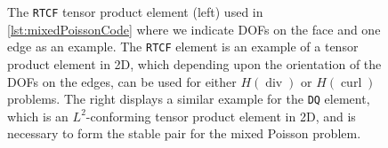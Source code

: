 \documentclass[format=acmsmall,screen,timestamp=false,a4paper]{acmart}
\DeclareMathOperator{\Div}{div}
\DeclareMathOperator{\curl}{curl}
\newcommand{\hcurl}{\ensuremath{{H}(\curl ) } }
\newcommand{\hdiv}{\ensuremath{{H}(\Div ) } }
\begin{document}
\begin{figure}[htbp]
\caption{The \texttt{RTCF} tensor product element \cite{raviart1977mixed} (left) used in \cref{lst:mixedPoissonCode} where we indicate DOFs on the face and one edge as an example.  The \texttt{RTCF} element is an example of a tensor product element in 2D, which depending upon the orientation of the DOFs on the edges, can be used for either \hdiv or \hcurl problems.  The right displays a similar example for the \texttt{DQ} element, which is an $L^2$-conforming tensor product element in 2D, and is necessary to form the stable pair for the mixed Poisson problem.\label{fig:RTCF}}
\end{figure}
  
\end{document}
